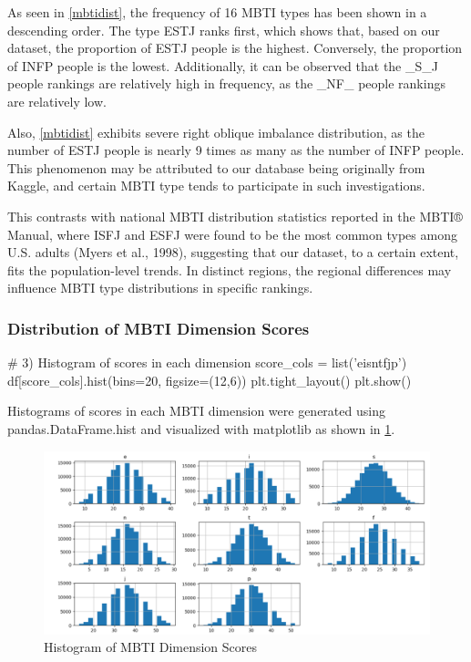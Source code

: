 \documentclass[12pt]{article}
\numberwithin{figure}{section}  %
\begin{document}
	As seen in \cref{mbtidist}, the frequency of 16 MBTI types has been shown
	in a descending order. The type ESTJ ranks first, which shows that, based on
	our dataset, the proportion of ESTJ people is the highest. Conversely, the
	proportion of INFP people is the lowest. Additionally, it can be observed
	that the \_S\_J people rankings are relatively high in frequency, as the
	\_NF\_ people rankings are relatively low.
	
	Also, \cref{mbtidist} exhibits severe right oblique imbalance distribution, as
	the number of ESTJ people is nearly 9 times as many as the number of INFP
	people. This phenomenon may be attributed to our database being originally
	from Kaggle, and certain MBTI type tends to participate in such
	investigations.
	
	This contrasts with national MBTI distribution statistics reported in the
	MBTI® Manual, where ISFJ and ESFJ were found to be the most common types
	among U.S. adults (Myers et al., 1998), suggesting that our dataset, to a
	certain extent, fits the population-level trends. In distinct regions, the
	regional differences may influence MBTI type distributions in specific
	rankings.
	
	\subsubsection{Distribution of MBTI Dimension Scores}
	
	\begin{python}
# 3) Histogram of scores in each dimension
score_cols = list('eisntfjp')
df[score_cols].hist(bins=20, figsize=(12,6))
plt.tight_layout()
plt.show()
	\end{python}
	
	Histograms of scores in each MBTI dimension were generated using
	pandas.DataFrame.hist and visualized with matplotlib as shown in \cref{mbtihisto}.
	\begin{figure}[H]
		\centering
		\includegraphics{Q1EDA4} 
		\caption{Histogram of MBTI Dimension Scores}
		\label{mbtihisto}		
	\end{figure}
	
\end{document}
